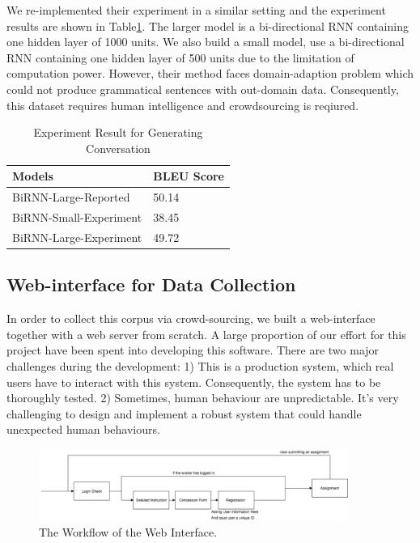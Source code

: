 \documentclass[bsc,frontabs,twoside,singlespacing,parskip,deptreport]{infthesis}     %
\begin{document}
We re-implemented their experiment in a similar setting and the experiment results are shown in Table\ref{tab:genresult}. The larger model is a bi-directional RNN containing one hidden layer of 1000 units. We also build a small model, use a bi-directional RNN containing one hidden layer of 500 units due to the limitation of computation power. However, their method faces domain-adaption problem which could not produce grammatical sentences with out-domain data. Consequently, this dataset requires human intelligence and crowdsourcing is reqiured. 

\begin{table}[]
\centering
\begin{tabular}{|l|l|}
\hline
Models                 & BLEU Score \\ \hline
BiRNN-Large-Reported   & 50.14      \\ \hline
BiRNN-Small-Experiment & 38.45      \\ \hline
BiRNN-Large-Experiment & 49.72      \\ \hline
\end{tabular}
\caption{Experiment Result for Generating Conversation\cite{indurthi2017generating}}
\label{tab:genresult}
\end{table}

\newpage
\subsection{Web-interface for Data Collection}

In order to collect this corpus via crowd-sourcing, we built a web-interface together with a web server from scratch. A large proportion of our effort for this project have been spent into developing this software. There are two major challenges during the development: 1) This is a production system, which real users have to interact with this system. Consequently, the system has to be thoroughly tested. 2) Sometimes, human behaviour are unpredictable. It's very challenging to design and implement a robust system that could handle unexpected human behaviours.


\begin{figure}[h]
    \centering
    \includegraphics[width=0.9\textwidth]{process.png}
    \caption{The Workflow of the Web Interface.}
    \label{fig:web}
\end{figure}
\end{document}
